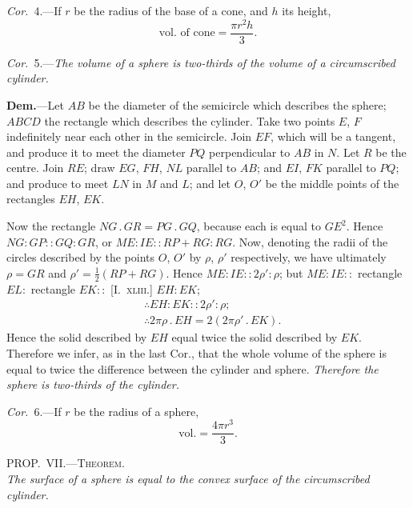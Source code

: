 \documentclass[oneside]{book}
\newcommand\myprop[2]{
\bigskip\Needspace*{4\baselineskip}\begin{center}\textsc{#1}\\\medskip\emph{#2}\par\end{center}
}
\newcommand\imgcent[2]{
\begin{center}
\end{center}
}
\begin{document}
\emph{Cor.}~4.---If $r$ be the radius of the base of a cone, and
$h$ its height,
\[
\text{vol.\ of cone} = \frac{ \pi r^2 h }{3}.
\]

\emph{Cor.}~5.---\textit{The volume of a sphere is two-thirds of the
volume of a circumscribed cylinder.}

\imgcent{200}{f247}

\textbf{Dem.}---Let $AB$ be the diameter of the semicircle
which describes the sphere; $ABCD$ the rectangle which
describes the cylinder. Take two points $E$, $F$ indefinitely
near each other in the semicircle. Join $EF$, which
will be a tangent, and produce it to meet the diameter
$PQ$ perpendicular to $AB$ in $N$. Let $R$ be the centre.
Join $RE$; draw $EG$, $FH$, $NL$ parallel to $AB$; and $EI$,
$FK$ parallel to $PQ$; and produce to meet $LN$ in $M$ and
$L$; and let $O$, $O'$ be the middle points of the rectangles
$EH$, $EK$.

Now the rectangle $NG\,.\,GR = PG\,.\,GQ$, because each
is equal to $GE^{2}$. Hence $NG : GP :: GQ : GR$, or
$ME : IE :: RP+RG : RG$. Now, denoting the radii of
the circles described by the points $O$, $O'$ by $\rho$, $\rho'$ respectively,
we have ultimately $\rho = GR$ and $\rho' =\frac{1}{2}(RP + RG)$.
Hence $ME : IE :: 2\rho' : \rho$; but $ME : IE ::$ rectangle
$EL:$ rectangle $EK ::$ [I.~\textsc{xliii.}] $EH : EK$;
\begin{align*}
&  \therefore EH : EK :: 2\rho' : \rho;  \\
&  \therefore 2\pi\rho \,.\,EH = 2(2\pi\rho' \,.\,EK).
\end{align*}
Hence the solid described by $EH$ equal twice the solid
described by $EK$. Therefore we infer, as in the last
Cor., that the whole volume of the sphere is equal to
twice the difference between the cylinder and sphere.
\emph{Therefore the sphere is two-thirds of the cylinder.}

\emph{Cor.}~6.---If $r$ be the radius of a sphere,
\[
\text{vol.} = \frac{4\pi r^3 }{3}.
\]

\myprop{PROP\@.~VII\@.---Theorem.}{The surface of a sphere\index{Sphere} is equal to the convex surface of
the circumscribed cylinder.}

\imgcent{190}{f248}
\end{document}
